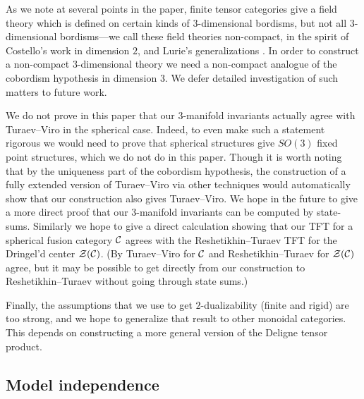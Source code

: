 \documentclass{amsart}
\begin{document}
As we note at several points in the paper, finite tensor categories give a field theory which is defined on certain kinds of $3$-dimensional bordisms, but not all $3$-dimensional bordisms---we call these field theories non-compact, in the spirit of Costello's work \cite{MR2298823} in dimension $2$, and Lurie's generalizations \cite[\S 4.2]{lurie-ch}.  In order to construct a non-compact $3$-dimensional theory we need a non-compact analogue of the cobordism hypothesis in dimension $3$.  We defer detailed investigation of such matters to future work.

We do not prove in this paper that our $3$-manifold invariants actually agree with Turaev--Viro in the spherical case.  Indeed, to even make such a statement rigorous we would need to prove that spherical structures give $SO(3)$ fixed point structures, which we do not do in this paper.  Though it is worth noting that by the uniqueness part of the cobordism hypothesis, the construction of a fully extended version of Turaev--Viro via other techniques would automatically show that our construction also gives Turaev--Viro.  We hope in the future to give a more direct proof that our $3$-manifold invariants can be computed by state-sums.  Similarly we hope to give a direct calculation showing that our TFT for a spherical fusion category $\mathcal C$ agrees with the Reshetikhin--Turaev TFT for the Dringel'd center $\mathcal Z(\mathcal C)$.  (By \cite{1006.3501} Turaev--Viro for $\mathcal C$ and Reshetikhin--Turaev for $\mathcal Z(\mathcal C)$ agree, but it may be possible to get directly from our construction to Reshetikhin--Turaev without going through state sums.)

Finally, the assumptions that we use to get $2$-dualizability (finite and rigid) are too strong, and we hope to generalize that result to other monoidal categories.  This depends on constructing a more general version of the Deligne tensor product.

\subsection*{Model independence} 
\end{document}
